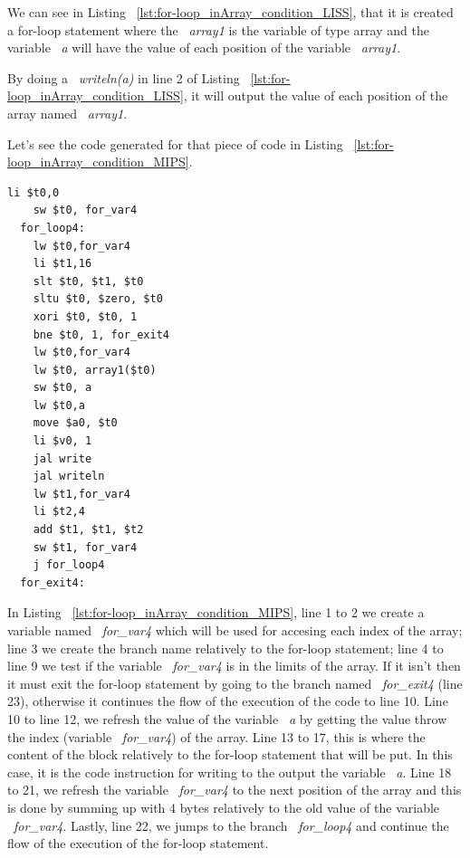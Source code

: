 \documentclass[
  oneside,
  11pt, a4paper,
  footinclude=true,
  headinclude=true,
  cleardoublepage=empty
]{scrbook}
\begin{document}
We can see in Listing ~\ref{lst:for-loop_inArray_condition_LISS}, that it is created a for-loop statement where the ~\textit{array1} is the variable of type array and the variable ~\textit{a} will have the value of each position of the variable ~\textit{array1}.

By doing a ~\textit{writeln(a)} in line 2 of Listing ~\ref{lst:for-loop_inArray_condition_LISS}, it will output the value of each position of the array named ~\textit{array1}.

Let's see the code generated for that piece of code in Listing ~\ref{lst:for-loop_inArray_condition_MIPS}.

\begin{lstlisting}[caption={Code generated for the LISS code in Listing ~\ref{lst:for-loop_inArray_condition_LISS}},label={lst:for-loop_inArray_condition_MIPS}]
    li $t0,0		
    sw $t0, for_var4		
  for_loop4:
    lw $t0,for_var4		
    li $t1,16		
    slt $t0, $t1, $t0	
    sltu $t0, $zero, $t0	
    xori $t0, $t0, 1	
    bne $t0, 1, for_exit4		
    lw $t0,for_var4		
    lw $t0, array1($t0)		
    sw $t0, a		
    lw $t0,a		
    move $a0, $t0		
    li $v0, 1
    jal write		
    jal writeln		
    lw $t1,for_var4		
    li $t2,4		
    add $t1, $t1, $t2	
    sw $t1, for_var4		
    j for_loop4		
  for_exit4:
\end{lstlisting}

In Listing ~\ref{lst:for-loop_inArray_condition_MIPS}, line 1 to 2 we create a variable named ~\textit{for\_var4} which will be used for accesing each index of the array; line 3 we create the branch name relatively to the for-loop statement; line 4 to line 9 we test if the variable ~\textit{for\_var4} is in the limits of the array. If it isn't then it must exit the for-loop statement by going to the branch named ~\textit{for\_exit4} (line 23), otherwise it continues the flow of the execution of the code to line 10. Line 10 to line 12, we refresh the value of the variable ~\textit{a} by getting the value throw the index (variable ~\textit{for\_var4}) of the array. Line 13 to 17, this is where the content of the block relatively to the for-loop statement that will be put. In this case, it is the code instruction for writing to the output the variable ~\textit{a}. Line 18 to 21, we refresh the variable ~\textit{for\_var4} to the next position of the array and this is done by summing up with 4 bytes relatively to the old value of the variable ~\textit{for\_var4}. Lastly, line 22, we jumps to the branch ~\textit{for\_loop4} and continue the flow of the execution of the for-loop statement.
\end{document}
